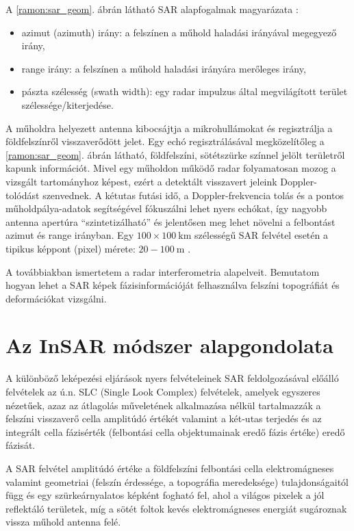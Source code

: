 \documentclass[12pt]{report}
\numberwithin{equation}{section}
\numberwithin{table}{section}
\numberwithin{figure}{section}
\begin{document}
A \ref{ramon:sar_geom}. ábrán látható SAR alapfogalmak magyarázata \cite{BurgmannInSAR}:
\begin{itemize}
\item azimut (azimuth) irány: a felszínen a műhold haladási irányával megegyező irány,
\item range irány: a felszínen a műhold haladási irányára merőleges irány,
\item pászta szélesség (swath width): egy radar impulzus által megvilágított terület szélessége/kiterjedése.
\end{itemize}

A műholdra helyezett antenna kibocsájtja a mikrohullámokat és regisztrálja a földfelszínről visszaverődött jelet. Egy echó regisztrálásával megközelítőleg a \ref{ramon:sar_geom}. ábrán látható, földfelszíni, sötétszürke színnel jelölt területről kapunk információt. Mivel egy műholdon működő radar folyamatosan mozog a vizsgált tartományhoz képest, ezért a detektált visszavert jeleink Doppler-tolódást szenvednek. A kétutas futási idő, a Doppler-frekvencia tolás és a pontos műholdpálya-adatok segítségével fókuszálni lehet nyers echókat, így nagyobb antenna apertúra ``szintetizálható'' és jelentősen meg lehet növelni a felbontást azimut és range irányban. Egy $100 \times \SI{100}{\kilo\meter}$ szélességű SAR felvétel esetén a tipikus képpont (pixel) mérete: $20 - \SI{100}{\meter}$ \cite{BurgmannInSAR}.

A továbbiakban ismertetem a radar interferometria alapelveit. Bemutatom hogyan lehet a SAR képek fázisinformációját felhasználva felszíni topográfiát és deformációkat vizsgálni.

\section{Az InSAR módszer alapgondolata}

A különböző leképezési eljárások nyers felvételeinek SAR feldolgozásával előálló felvételek az ú.n. SLC (Single Look Complex) felvételek, amelyek egyszeres nézetűek, azaz az átlagolás műveletének alkalmazása nélkül tartalmazzák a felszíni visszaverő cella amplitúdó értékét valamint a két-utas terjedés és az integrált cella fázisérték (felbontási cella objektumainak eredő fázis értéke) eredő fázisát.

A SAR felvétel amplitúdó értéke a földfelszíni felbontási cella elektromágneses valamint geometriai (felszín érdessége, a topográfia meredeksége) tulajdonságaitól függ és egy szürkeárnyalatos képként fogható fel, ahol a világos pixelek a jól reflektáló területek, míg a sötét foltok kevés elektromágneses energiát sugároznak vissza műhold antenna felé.
\end{document}
